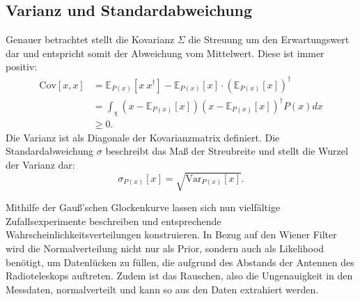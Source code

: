 \subsection{Varianz und Standardabweichung}
Genauer betrachtet stellt die Kovarianz $\Sigma$ die Streuung um den Erwartungswert dar und entspricht somit der Abweichung vom Mittelwert. Diese ist immer positiv:
\begin{equation}
  \begin{aligned}
    \text{Cov} [x, x] &= \mathbb{E} _{P(x)} [x \ x^{\dagger}] - \mathbb{E} _{P(x)} [x] \cdot (\mathbb{E} _{P(x)} [x])^{\dagger} \\ 
&= \int_ {\chi} (x - \mathbb{E} _{P(x)} [x]) (x - \mathbb{E} _{P(x)} [x])^{\dagger} P(x) dx \\ &\geq 0.
  \end{aligned}
\end{equation}
Die Varianz ist als Diagonale der Kovarianzmatrix definiert. Die Standardabweichung $\sigma$ beschreibt das Maß der Streubreite und stellt die Wurzel der Varianz dar:
\begin{equation}
\sigma _{P(x)} [x] = \sqrt{\text{Var} _{P(x)} [x]}.
\end{equation}

Mithilfe der Gauß'schen Glockenkurve lassen sich nun vielfältige Zufallsexperimente beschreiben und entsprechende Wahrscheinlichkeitsverteilungen konstruieren. In Bezug auf den Wiener Filter wird die Normalverteilung nicht nur als Prior, sondern auch als Likelihood benötigt, um Datenlücken zu füllen, die aufgrund des Abstands der Antennen des Radioteleskops auftreten. Zudem ist das Rauschen, also die Ungenauigkeit in den Messdaten, normalverteilt und kann so aus den Daten extrahiert werden.
